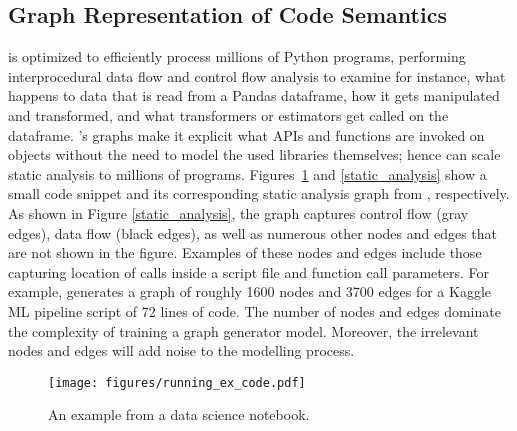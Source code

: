 \subsection{Graph Representation of Code Semantics}


{\sysGC} is optimized to efficiently process millions of Python programs, performing interprocedural data flow and control flow analysis to examine for instance, what happens to data that is read from a Pandas dataframe, how it gets manipulated and transformed, and what transformers or estimators get called on the dataframe.  {\sysGC}'s graphs make it explicit what APIs and functions are invoked on objects without the need to model the used  libraries themselves; hence {\sysGC} can scale static analysis to millions of programs. 
Figures~\ref{running_ex} and \ref{static_analysis} show a small code snippet and its corresponding static analysis graph from {\sysGC}, respectively. As shown in Figure \ref{static_analysis}, the graph captures control flow (gray edges), data flow (black edges), as well as numerous other nodes and edges that are not shown in the figure. Examples of these nodes and edges include those capturing location of calls inside a script file and function call parameters. For example, {\sysGC} generates a graph of roughly 1600 nodes and 3700 edges for a Kaggle ML pipeline script of 72 lines of code. The number of nodes and edges dominate the complexity of training a graph generator model. Moreover, the irrelevant nodes and edges will add noise to the modelling process. 

\begin{figure}
\ncp\ncp
 \centering
  \texttt{[image: figures/running\_ex\_code.pdf]}
  \ncp\ncp\ncp
  \caption{An example from a data science notebook. 
  }
  \label{running_ex}
  \ncp\ncp\ncp\ncp
\end{figure}

